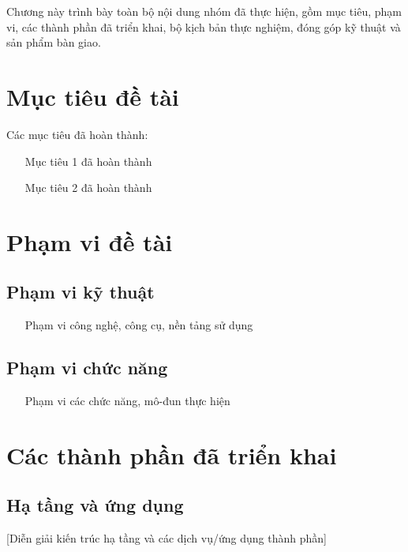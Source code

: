 Chương này trình bày toàn bộ nội dung nhóm đã thực hiện, gồm mục tiêu, phạm vi, các thành phần đã triển khai, bộ kịch bản thực nghiệm, đóng góp kỹ thuật và sản phẩm bàn giao.

\section{Mục tiêu đề tài}

Các mục tiêu đã hoàn thành:
\begin{itemize}
    \item [Mục tiêu 1 đã hoàn thành]
    \item [Mục tiêu 2 đã hoàn thành]
\end{itemize}

\section{Phạm vi đề tài}

\subsection{Phạm vi kỹ thuật}
\begin{itemize}
    \item [Phạm vi công nghệ, công cụ, nền tảng sử dụng]
\end{itemize}

\subsection{Phạm vi chức năng}
\begin{itemize}
    \item [Phạm vi các chức năng, mô-đun thực hiện]
\end{itemize}

\section{Các thành phần đã triển khai}

\subsection{Hạ tầng và ứng dụng}
[Diễn giải kiến trúc hạ tầng và các dịch vụ/ứng dụng thành phần]

